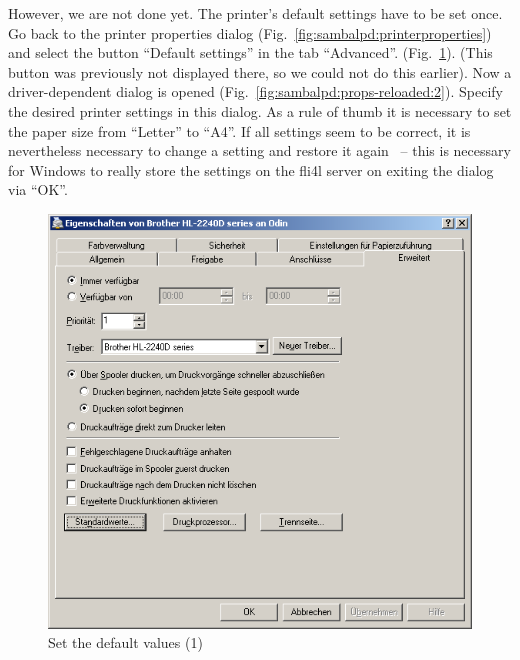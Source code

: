 However, we are not done yet. The printer's default settings have to be set once.
Go back to the printer properties dialog (Fig.~\ref{fig:sambalpd:printerproperties})
and select the button ``Default settings'' in the tab ``Advanced''.
(Fig.~\ref{fig:sambalpd:props-reloaded:1}). (This button was previously
not displayed there, so we could not do this earlier).
Now a driver-dependent dialog is opened
(Fig.~\ref{fig:sambalpd:props-reloaded:2}). Specify the desired printer
settings in this dialog. As a rule of thumb it is necessary to set the
paper size from ``Letter'' to ``A4''. If all settings seem to be correct,
it is nevertheless necessary to change a setting and restore it
again ~-- this is necessary for Windows to really store the settings
on the fli4l server on exiting the dialog via ``OK''.

\begin{figure}[hbt!]
\centering
\includegraphics[width=0.8\columnwidth]{image018}
\caption{Set the default values (1)}
\label{fig:sambalpd:props-reloaded:1}
\end{figure}

